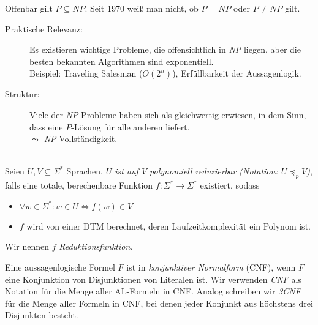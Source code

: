 {%
Offenbar gilt $P\subseteq \textit{NP}$. Seit 1970 weiß man nicht, ob $P=\textit{NP}$ oder $P\neq \textit{NP}$ gilt.
\begin{description}
\item[Praktische Relevanz:] Es existieren wichtige Probleme, die offensichtlich in \textit{NP} liegen, aber die besten bekannten Algorithmen sind exponentiell.\\
	Beispiel: Traveling Salesman ($O(2^n)$), Erfüllbarkeit der Aussagenlogik.
\item[Struktur:] Viele der \textit{NP}-Probleme haben sich als gleichwertig erwiesen, in dem Sinn, dass eine $P$-Lösung für alle anderen liefert.\\
	$\leadsto$ \textit{NP}-Vollständigkeit.
\end{description}
}

\begin{Def}\label{def:PolyReduktion}\ \\
  Seien $U, V \subseteq \Sigma^*$ Sprachen.
  \emph{$U$ ist auf $V$ polynomiell reduzierbar (Notation: $U \preceq_p V$)}, falls eine totale, berechenbare Funktion
  $f:\Sigma^* \to \Sigma^*$ existiert, sodass
  \begin{itemize}
   \item $\forall w \in \Sigma^*:w \in U \iff f(w) \in V$
   \item $f$ wird von einer \ac{DTM} berechnet, deren Laufzeitkomplexität ein Polynom ist.
  \end{itemize}
  Wir nennen $f$ \emph{Reduktionsfunktion}.
\end{Def}

Eine aussagenlogische Formel $F$ ist in \emph{konjunktiver Normalform} (CNF), wenn $F$ eine Konjunktion von Disjunktionen von Literalen ist.
Wir verwenden \emph{CNF} als Notation für die Menge aller AL-Formeln in CNF.
Analog schreiben wir \emph{3CNF} für die Menge aller Formeln in CNF, bei denen jeder Konjunkt aus höchstens drei Disjunkten besteht.



